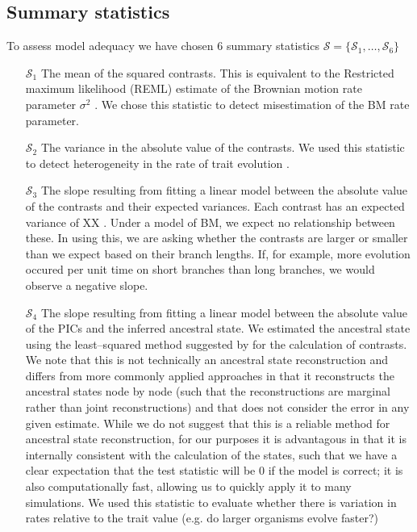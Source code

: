 \documentclass[a4paper,12pt]{article}
\begin{document}
\subsection*{Summary statistics}

To assess model adequacy we have chosen 6 summary statistics $\mathcal{S} = \lbrace \mathcal{S}_1, \ldots, \mathcal{S}_6 \rbrace$

\begin{enumerate}
\item[$\mathcal{S}_1$] The mean of the squared contrasts. This is equivalent to the Restricted maximum likelihood (REML) estimate of the Brownian motion rate parameter $\sigma^2$ \citep{Garland1992, Rohlf2001}. We chose this statistic to detect misestimation of the BM rate parameter.

\item[$\mathcal{S}_2$] The variance in the absolute value of the contrasts. We used this statistic to detect heterogeneity in the rate of trait evolution \citep[\textit{sensu}][]{Omeara2006, Eastman2011}.

\item[$\mathcal{S}_3$] The slope resulting from fitting a linear model between the absolute value of the contrasts and their expected variances. Each contrast has an expected variance of XX \citep{Felsenstein1985}. Under a model of BM, we expect no relationship between these. In using this, we are asking whether the contrasts are larger or smaller than we expect based on their branch lengths. If, for example, more evolution occured per unit time on short branches than long branches, we would observe a negative slope.

\item[$\mathcal{S}_4$] The slope resulting from fitting a linear model between the absolute value of the PICs and the inferred ancestral state. We estimated the ancestral state using the least--squared method suggested by \citep{Felsenstein1985} for the calculation of contrasts. We note that this is not technically an ancestral state reconstruction and differs from more commonly applied approaches \citep[such as the  maximum likelihood estimator][]{Schluter1997} in that it reconstructs the ancestral states node by node (such that the reconstructions are marginal rather than joint reconstructions) and that does not consider the error in any given estimate. While we do not suggest that this is a reliable method for ancestral state reconstruction, for our purposes it is advantagous in that it is internally consistent with the calculation of the states, such that we have a clear expectation that the test statistic will be 0 if the model is correct; it is also computationally fast, allowing us to quickly apply it to many simulations. We used this statistic to evaluate whether there is variation in rates relative to the trait value (e.g. do larger organisms evolve faster?)


\end{enumerate}
\end{document}
